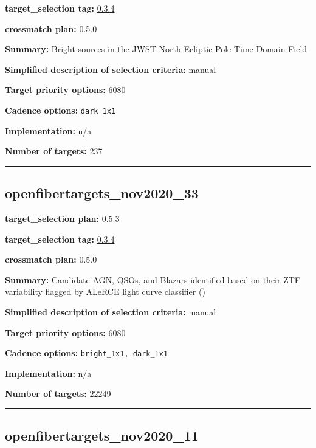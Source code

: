 \noindent\textbf{target\_selection tag:}
\href{https://github.com/sdss/target_selection/tree/0.3.4/}{0.3.4}

\noindent\textbf{crossmatch plan:} 0.5.0

\noindent\textbf{Summary:} Bright sources in the JWST North Ecliptic Pole
Time-Domain Field

\noindent\textbf{Simplified description of selection criteria:} manual


\noindent\textbf{Target priority options:} 6080

\noindent\textbf{Cadence options:} \texttt{dark\_1x1}

\noindent\textbf{Implementation:} n/a

\noindent\textbf{Number of targets:} 237

\begin{center}\rule{0.5\linewidth}{0.5pt}\end{center}

\hypertarget{openfibertargets_nov2020_33_plan0.5.3}{%
\subsection{openfibertargets\_nov2020\_33}\label{openfibertargets_nov2020_33_plan0.5.3}}

\noindent\textbf{target\_selection plan:} 0.5.3

\noindent\textbf{target\_selection tag:}
\href{https://github.com/sdss/target_selection/tree/0.3.4/}{0.3.4}

\noindent\textbf{crossmatch plan:} 0.5.0

\noindent\textbf{Summary:} Candidate AGN, QSOs, and Blazars identified based on
their ZTF variability flagged by ALeRCE light curve classifier
(\citealt{SanchezSaez2020})

\noindent\textbf{Simplified description of selection criteria:} manual


\noindent\textbf{Target priority options:} 6080

\noindent\textbf{Cadence options:} \texttt{bright\_1x1,\ dark\_1x1}

\noindent\textbf{Implementation:} n/a

\noindent\textbf{Number of targets:} 22249

\begin{center}\rule{0.5\linewidth}{0.5pt}\end{center}

\hypertarget{openfibertargets_nov2020_11_plan1.0.7}{%
\subsection{openfibertargets\_nov2020\_11}\label{openfibertargets_nov2020_11_plan1.0.7}}

